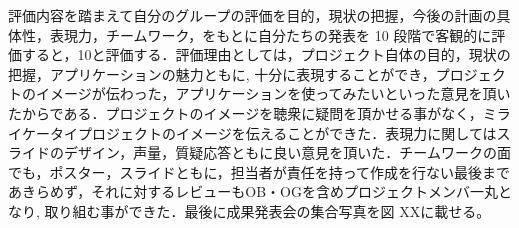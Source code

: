 評価内容を踏まえて自分のグループの評価を目的，現状の把握，今後の計画の具体性，表現力，チームワーク，をもとに自分たちの発表を 10 段階で客観的に評価すると，10と評価する．評価理由としては，プロジェクト自体の目的，現状の把握，アプリケーションの魅力ともに, 十分に表現することができ，プロジェクトのイメージが伝わった，アプリケーションを使ってみたいといった意見を頂いたからである．プロジェクトのイメージを聴衆に疑問を頂かせる事がなく，ミライケータイプロジェクトのイメージを伝えることができた．表現力に関してはスライドのデザイン，声量，質疑応答ともに良い意見を頂いた．チームワークの面でも，ポスター，スライドともに，担当者が責任を持って作成を行ない最後まであきらめず，それに対するレビューもOB・OGを含めプロジェクトメンバ一丸となり, 取り組む事ができた．最後に成果発表会の集合写真を図 XXに載せる。

